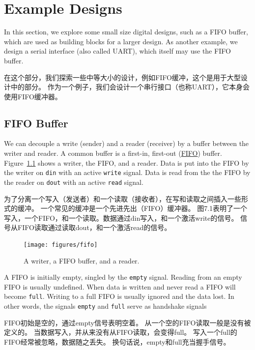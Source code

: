 \documentclass[%
    10pt,
    headinclude, footexclude,
    openright, %
    notitlepage,
    cleardoubleempty,
    headsepline,
    pointlessnumbers,
    bibtotoc, idxtotoc,
    ]{scrbook}
\newcommand{\code}[1]{{\small{\texttt{#1}}}}
\begin{document}
\chapter{Example Designs}

In this section, we explore some small size digital designs, such as
a FIFO buffer, which are used as building blocks for a larger design.
As another example, we design a serial interface (also called UART),
which itself may use the FIFO buffer.

在这个部分，我们探索一些中等大小的设计，例如FIFO缓冲，这个是用于大型设计中的部分。
作为一个例子，我们会设计一个串行接口（也称UART），它本身会使用FIFO缓冲器。

\section{FIFO Buffer}
\label{sec:fifo}

We can decouple a write (sender) and a reader (receiver) by a buffer
between the writer and reader.
A common buffer is a first-in, first-out
(\href{https://en.wikipedia.org/wiki/FIFO_%28computing_and_electronics%29}{FIFO})
buffer. Figure~\ref{fig:fifo} shows a writer, the FIFO, and a reader.
Data is put into the FIFO by the writer on \code{din} with an active
\code{write} signal. Data is read from the the FIFO by the reader on
\code{dout} with an active \code{read} signal.

为了分离一个写入（发送者）和一个读取（接收者），在写和读取之间插入一些形式的缓冲。
一个常见的缓冲是一个先进先出（FIFO）缓冲器。
图7.1表明了一个写入，一个FIFO，和一个读取。数据通过din写入，和一个激活write的信号。
信号从FIFO读取通过读取dout，和一个激活read的信号。

\begin{figure}
  \centering
  \texttt{[image: figures/fifo]}
  \caption{A writer, a FIFO buffer, and a reader.}
  \label{fig:fifo}
\end{figure}

A FIFO is initially empty, singled by the \code{empty} signal. Reading
from an empty FIFO is usually undefined. When data is written and never
read a FIFO will become \code{full}. Writing to a full FIFO is usually ignored
and the data lost. In other words, the signals \code{empty} and \code{full}
serve as handshake signals 

FIFO初始是空的，通过empty信号表明空着。
从一个空的FIFO读取一般是没有被定义的。
当数据写入，并从来没有从FIFO读取，会变得full。
写入一个full的FIFO经常被忽略，数据随之丢失。
换句话说，empty和full充当握手信号。
\end{document}
